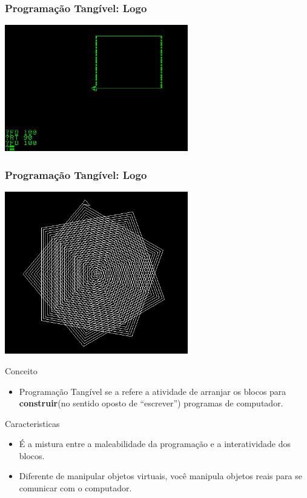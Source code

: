 \documentclass{beamer}
\begin{document}
 
\begin{frame}
  \frametitle{Programação Tangível: Logo}
  \begin{center}
    \includegraphics[width=8cm]{imagens/logo1.jpg}
    \end{center}
\end{frame}

\begin{frame}
  \frametitle{Programação Tangível: Logo}
  \begin{center}
    \includegraphics[width=8cm]{imagens/logo2.png}
  \end{center}
\end{frame}


\begin{frame}
  \begin{block}{Conceito}
    \begin{itemize}
    \item Programação Tangível se a refere a atividade de arranjar os blocos para \textbf{construir}(no sentido oposto de ``escrever'') programas de computador. ~\cite{McNerney2000}
    \end{itemize}
  \end{block}
  
  \begin{block}{Caracteristicas}
    \begin{itemize}
    \item É a mistura entre a maleabilidade da programação e a interatividade dos blocos.~\cite{McNerney2000}
    \item Diferente de manipular objetos virtuais, você manipula objetos reais para se comunicar com o computador.~\cite{McNerney2000}
    \end{itemize}
    \end{block}  
\end{frame}
\end{document}
